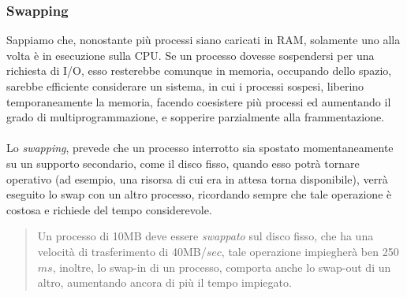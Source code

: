 \documentclass[12pt, letterpaper]{article}
\newcommand{\acc}{\\\hphantom{}\\}
\begin{document}
\subsubsection{Swapping}
Sappiamo che, nonostante più processi siano caricati in RAM, solamente uno alla volta è in esecuzione 
sulla CPU. Se un processo dovesse sospendersi per una richiesta di I/O, esso resterebbe comunque in memoria, occupando 
dello spazio, sarebbe efficiente considerare un sistema, in cui i processi sospesi, liberino temporaneamente la memoria, 
facendo coesistere più processi ed aumentando il grado di multiprogrammazione, e sopperire parzialmente alla frammentazione.\acc 
Lo \textit{swapping}, prevede che un processo interrotto sia spostato momentaneamente su un supporto secondario, come il 
disco fisso, quando esso potrà tornare operativo (ad esempio, una risorsa di cui era in attesa torna disponibile), verrà 
eseguito lo swap con un altro processo, ricordando sempre che tale operazione è costosa e richiede del tempo considerevole.
\begin{quote}
    \color{gray} Un processo di 10MB deve essere \textit{swappato} sul disco fisso, che ha una velocità 
    di trasferimento di 40MB/\(sec\), tale operazione impiegherà ben 250\(ms\), inoltre, lo swap-in di un processo, 
    comporta anche lo swap-out di un altro, aumentando ancora di più il tempo impiegato. 
\end{quote}
\end{document}
